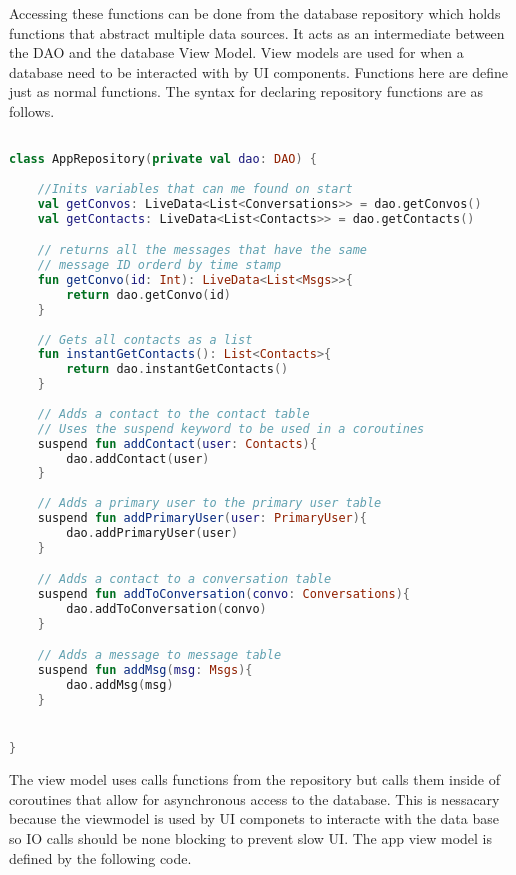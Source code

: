 \documentclass[../main/main.tex]{subfiles}
\begin{document}
Accessing these functions can be done from the database repository which holds functions that abstract multiple data sources.
It acts as an intermediate between the DAO and the database View Model. 
View models are used for when a database need to be interacted with by UI components. 
Functions here are define just as normal functions. 
The syntax for declaring repository functions are as follows. 

\begin{lstlisting}[caption={Example of repository definition.}, label={lst:example3}, language=Kotlin]

class AppRepository(private val dao: DAO) {
    
    //Inits variables that can me found on start
    val getConvos: LiveData<List<Conversations>> = dao.getConvos()
    val getContacts: LiveData<List<Contacts>> = dao.getContacts()

    // returns all the messages that have the same 
    // message ID orderd by time stamp
    fun getConvo(id: Int): LiveData<List<Msgs>>{
        return dao.getConvo(id)
    }
    
    // Gets all contacts as a list
    fun instantGetContacts(): List<Contacts>{
        return dao.instantGetContacts()
    }
    
    // Adds a contact to the contact table
    // Uses the suspend keyword to be used in a coroutines
    suspend fun addContact(user: Contacts){
        dao.addContact(user)
    }
    
    // Adds a primary user to the primary user table
    suspend fun addPrimaryUser(user: PrimaryUser){
        dao.addPrimaryUser(user)
    }

    // Adds a contact to a conversation table
    suspend fun addToConversation(convo: Conversations){
        dao.addToConversation(convo)
    }

    // Adds a message to message table
    suspend fun addMsg(msg: Msgs){
        dao.addMsg(msg)
    }


}
\end{lstlisting}

The view model uses calls functions from the repository but calls them inside of coroutines that allow for asynchronous access to the database. 
This is nessacary because the viewmodel is used by UI componets to interacte with the data base so IO calls should be none blocking to prevent slow UI.
The app view model is defined by the following code.
\end{document}
